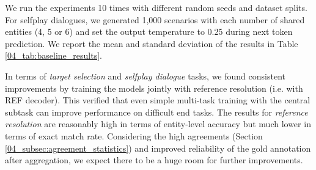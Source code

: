 \begin{table}[tb!]
\centering {}
\caption{\label{04_tab:baseline_results}
Results of our experiments. For reference resolution, \textit{accuracy} is computed at the entity-level and \textit{exact match rate} at the markable-level. Human scores are taken from Table \ref{03_tab:statistics} and \ref{04_tab:referent_identification_statistics} as a reference.
}
\end{table}

We run the experiments 10 times with different random seeds and dataset splits. For selfplay dialogues, we generated 1,000 scenarios with each number of shared entities (4, 5 or 6) and set the output temperature to 0.25 during next token prediction. We report the mean and standard deviation of the results in Table \ref{04_tab:baseline_results}.

In terms of \textit{target selection} and \textit{selfplay dialogue} tasks, we found consistent improvements by training the models jointly with reference resolution (i.e. with REF decoder). This verified that even simple multi-task training with the central subtask can improve performance on difficult end tasks. The results for \textit{reference resolution} are reasonably high in terms of entity-level accuracy but much lower in terms of exact match rate. Considering the high agreements (Section \ref{04_subsec:agreement_statistics}) and improved reliability of the gold annotation after aggregation, we expect there to be a huge room for further improvements.

